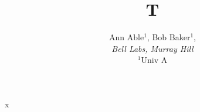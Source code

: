 \documentclass{article}
\title{T}
\author{Ann Able$^{1}$, Bob Baker$^{1}$,\\ {\it Bell Labs, Murray Hill}\\ $^{1}$Univ A}
\begin{document}
\maketitle
x
\end{document}
